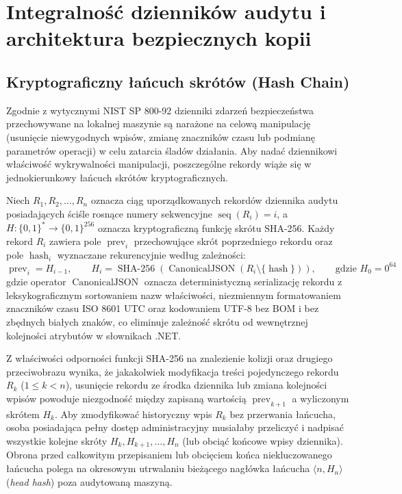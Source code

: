 \section{Integralność dzienników audytu i architektura bezpiecznych kopii}\label{sec:kryptografia-audyt-backup}

\subsection{Kryptograficzny łańcuch skrótów (Hash Chain)}\label{subsec:hash-chain-teoria}

Zgodnie z wytycznymi NIST SP 800-92 \cite{nist-sp800-92} dzienniki zdarzeń bezpieczeństwa przechowywane na lokalnej maszynie są narażone na celową manipulację (usunięcie niewygodnych wpisów, zmianę znaczników czasu lub podmianę parametrów operacji) w celu zatarcia śladów działania. Aby nadać dziennikowi właściwość wykrywalności manipulacji, poszczególne rekordy wiąże się w jednokierunkowy łańcuch skrótów kryptograficznych.

\begin{definition}\label{def:hash-chain}
Niech $R_1, R_2, \dots, R_n$ oznacza ciąg uporządkowanych rekordów dziennika audytu posiadających ściśle rosnące numery sekwencyjne $\operatorname{seq}(R_i) = i$, a $H \colon \{0,1\}^* \to \{0,1\}^{256}$ oznacza kryptograficzną funkcję skrótu SHA-256. Każdy rekord $R_i$ zawiera pole $\operatorname{prev}_i$ przechowujące skrót poprzedniego rekordu oraz pole $\operatorname{hash}_i$ wyznaczane rekurencyjnie według zależności:
\begin{equation}\label{eq:hash-chain}
    \operatorname{prev}_i = H_{i-1}, \qquad H_i = \operatorname{SHA-256}\!\left(\operatorname{CanonicalJSON}(R_i \setminus \{\operatorname{hash}\})\right), \qquad \text{gdzie } H_0 = 0^{64}
\end{equation}
gdzie operator $\operatorname{CanonicalJSON}$ oznacza deterministyczną serializację rekordu z leksykograficznym sortowaniem nazw właściwości, niezmiennym formatowaniem znaczników czasu ISO 8601 UTC oraz kodowaniem UTF-8 bez BOM i bez zbędnych białych znaków, co eliminuje zależność skrótu od wewnętrznej kolejności atrybutów w słownikach .NET.
\end{definition}

Z właściwości odporności funkcji SHA-256 na znalezienie kolizji oraz drugiego przeciwobrazu wynika, że jakakolwiek modyfikacja treści pojedynczego rekordu $R_k$ ($1 \le k < n$), usunięcie rekordu ze środka dziennika lub zmiana kolejności wpisów powoduje niezgodność między zapisaną wartością $\operatorname{prev}_{k+1}$ a wyliczonym skrótem $H_k$. Aby zmodyfikować historyczny wpis $R_k$ bez przerwania łańcucha, osoba posiadająca pełny dostęp administracyjny musiałaby przeliczyć i nadpisać wszystkie kolejne skróty $H_k, H_{k+1}, \dots, H_n$ (lub obciąć końcowe wpisy dziennika). Obrona przed całkowitym przepisaniem lub obcięciem końca niekluczowanego łańcucha polega na okresowym utrwalaniu bieżącego nagłówka łańcucha $\langle n, H_n \rangle$ (\textit{head hash}) poza audytowaną maszyną.

